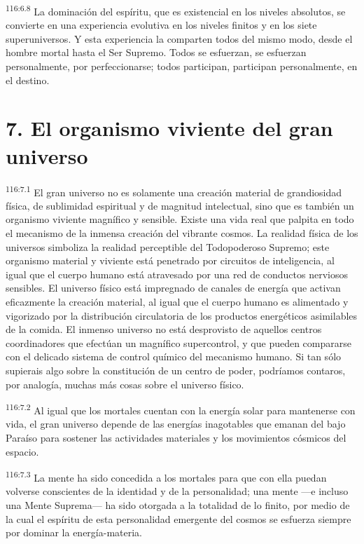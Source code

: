 \par
\textsuperscript{116:6.8} La dominación del espíritu, que es existencial en los niveles absolutos, se convierte en una experiencia evolutiva en los niveles finitos y en los siete superuniversos. Y esta experiencia la comparten todos del mismo modo, desde el hombre mortal hasta el Ser Supremo. Todos se esfuerzan, se esfuerzan personalmente, por perfeccionarse; todos participan, participan personalmente, en el destino.

\section*{7. El organismo viviente del gran universo}
\par
\textsuperscript{116:7.1} El gran universo no es solamente una creación material de grandiosidad física, de sublimidad espiritual y de magnitud intelectual, sino que es también un organismo viviente magnífico y sensible. Existe una vida real que palpita en todo el mecanismo de la inmensa creación del vibrante cosmos. La realidad física de los universos simboliza la realidad perceptible del Todopoderoso Supremo; este organismo material y viviente está penetrado por circuitos de inteligencia, al igual que el cuerpo humano está atravesado por una red de conductos nerviosos sensibles. El universo físico está impregnado de canales de energía que activan eficazmente la creación material, al igual que el cuerpo humano es alimentado y vigorizado por la distribución circulatoria de los productos energéticos asimilables de la comida. El inmenso universo no está desprovisto de aquellos centros coordinadores que efectúan un magnífico supercontrol, y que pueden compararse con el delicado sistema de control químico del mecanismo humano. Si tan sólo supierais algo sobre la constitución de un centro de poder, podríamos contaros, por analogía, muchas más cosas sobre el universo físico.

\par
\textsuperscript{116:7.2} Al igual que los mortales cuentan con la energía solar para mantenerse con vida, el gran universo depende de las energías inagotables que emanan del bajo Paraíso para sostener las actividades materiales y los movimientos cósmicos del espacio.

\par
\textsuperscript{116:7.3} La mente ha sido concedida a los mortales para que con ella puedan volverse conscientes de la identidad y de la personalidad; una mente ---e incluso una Mente Suprema--- ha sido otorgada a la totalidad de lo finito, por medio de la cual el espíritu de esta personalidad emergente del cosmos se esfuerza siempre por dominar la energía-materia.

